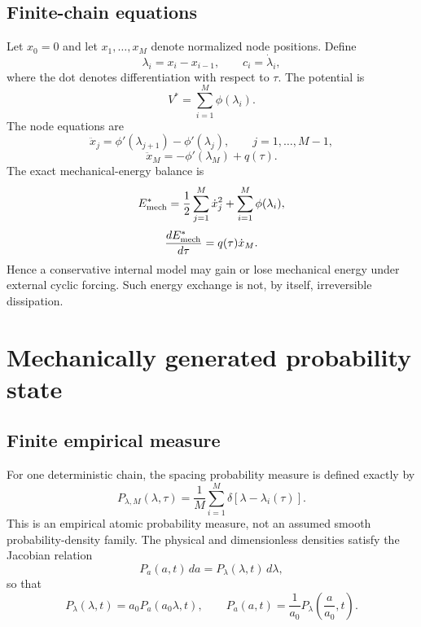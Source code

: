 \documentclass[11pt]{article}
\begin{document}
\subsection{Finite-chain equations}
Let \(x_0=0\) and let \(x_1,\ldots,x_M\) denote normalized node positions. Define
\begin{equation}
\lambda_i=x_i-x_{i-1},\qquad c_i=\dot\lambda_i,
\end{equation}
where the dot denotes differentiation with respect to \(\tau\). The potential is
\begin{equation}
V^*=\sum_{i=1}^{M}\phi(\lambda_i).
\end{equation}
The node equations are
\begin{equation}
\ddot x_j=\phi'(\lambda_{j+1})-\phi'(\lambda_j),\qquad j=1,\ldots,M-1,
\end{equation}
\begin{equation}
\ddot x_M=-\phi'(\lambda_M)+q(\tau).
\end{equation}
The exact mechanical-energy balance is
\begin{equation}
E_{\rm mech}^*=\frac12\sum_{j=1}^{M}\dot x_j^2+\sum_{i=1}^{M}\phi(\lambda_i),
\end{equation}
\begin{equation}
\frac{dE_{\rm mech}^*}{d\tau}=q(\tau)\dot x_M.
\label{eq:energybalance}
\end{equation}
Hence a conservative internal model may gain or lose mechanical energy under external cyclic forcing. Such energy exchange is not, by itself, irreversible dissipation.

\section{Mechanically generated probability state}
\subsection{Finite empirical measure}
For one deterministic chain, the spacing probability measure is defined exactly by
\begin{equation}
P_{\lambda,M}(\lambda,\tau)
=\frac1M\sum_{i=1}^{M}\delta\!\left[\lambda-\lambda_i(\tau)\right].
\label{eq:empiricalP}
\end{equation}
This is an empirical atomic probability measure, not an assumed smooth probability-density family. The physical and dimensionless densities satisfy the Jacobian relation
\begin{equation}
P_a(a,t)\,da=P_\lambda(\lambda,t)\,d\lambda,
\end{equation}
so that
\begin{equation}
P_\lambda(\lambda,t)=a_0P_a(a_0\lambda,t),
\qquad
P_a(a,t)=\frac1{a_0}P_\lambda\!\left(\frac{a}{a_0},t\right).
\end{equation}
\end{document}
